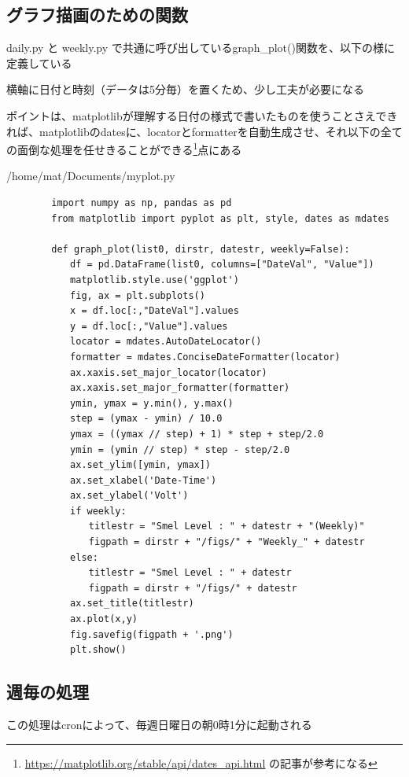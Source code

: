 \documentclass[12pt,a4paper,uplatex]{jsarticle}
\begin{document}
\subsection{グラフ描画のための関数}

daily.py と weekly.py で共通に呼び出しているgraph\_plot()関数を、以下の様に定義している

横軸に日付と時刻（データは5分毎）を置くため、少し工夫が必要になる

ポイントは、matplotlibが理解する日付の様式で書いたものを使うことさえできれば、matplotlibのdatesに、locatorとformatterを自動生成させ、それ以下の全ての面倒な処理を任せきることができる\footnote{\url{https://matplotlib.org/stable/api/dates_api.html}
	の記事が参考になる}点にある

\begin{itembox}[l]{/home/mat/Documents/myplot.py}
	\begin{verbatim}
		import numpy as np, pandas as pd
		from matplotlib import pyplot as plt, style, dates as mdates
		
		def graph_plot(list0, dirstr, datestr, weekly=False):
		　　df = pd.DataFrame(list0, columns=["DateVal", "Value"])
		　　matplotlib.style.use('ggplot')
		　　fig, ax = plt.subplots()
		　　x = df.loc[:,"DateVal"].values
		　　y = df.loc[:,"Value"].values
		　　locator = mdates.AutoDateLocator()
		　　formatter = mdates.ConciseDateFormatter(locator)
		　　ax.xaxis.set_major_locator(locator)
		　　ax.xaxis.set_major_formatter(formatter)
		　　ymin, ymax = y.min(), y.max()
		　　step = (ymax - ymin) / 10.0
		　　ymax = ((ymax // step) + 1) * step + step/2.0
		　　ymin = (ymin // step) * step - step/2.0
		　　ax.set_ylim([ymin, ymax])
		　　ax.set_xlabel('Date-Time')
		　　ax.set_ylabel('Volt')
		　　if weekly:
		　　　　titlestr = "Smel Level : " + datestr + "(Weekly)"
		　　　　figpath = dirstr + "/figs/" + "Weekly_" + datestr
		　　else:
		　　　　titlestr = "Smel Level : " + datestr
		　　　　figpath = dirstr + "/figs/" + datestr
		　　ax.set_title(titlestr)
		　　ax.plot(x,y)
		　　fig.savefig(figpath + '.png')
		　　plt.show()	
	\end{verbatim}
\end{itembox}

\newpage

\subsection{週毎の処理}

この処理はcronによって、毎週日曜日の朝0時1分に起動される
\end{document}
